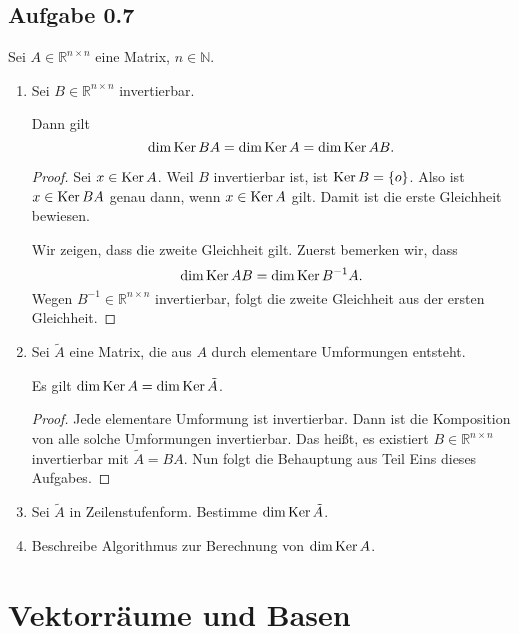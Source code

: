 \subsection*{Aufgabe 0.7}
Sei \(A \in \mathbb{R}^{n \times n}\) eine Matrix, \(n \in \mathbb{N}\).
\begin{enumerate}
\item Sei \(B \in \mathbb{R}^{n \times n}\) invertierbar.
  \begin{Behauptung}
    Dann gilt
    \[\dim \operatorname{Ker} B A = \dim \operatorname{Ker} A = \dim \operatorname{Ker} A B.\]
  \end{Behauptung}
  \begin{proof}
    Sei \(x \in \operatorname{Ker} A\).  Weil \(B\) invertierbar ist, ist \(\operatorname{Ker} B =
    \{o\}\).  Also ist \(x \in \operatorname{Ker} B A\) genau dann, wenn \(x \in \operatorname{Ker}
    A\) gilt.  Damit ist die erste Gleichheit bewiesen.

    Wir zeigen, dass die zweite Gleichheit gilt.  Zuerst bemerken wir,
    dass \[\dim \operatorname{Ker} A B = \dim \operatorname{Ker} B^{-1} A.\]  Wegen \(B^{-1} \in
    \mathbb{R}^{n \times n}\) invertierbar, folgt die zweite Gleichheit aus der
    ersten Gleichheit.
  \end{proof}

\item Sei \(\tilde{A}\) eine Matrix, die aus \(A\) durch elementare
  Umformungen entsteht.
  \begin{Behauptung}
    Es gilt \(\dim \operatorname{Ker} A = \dim \operatorname{Ker} \tilde{A}\).
  \end{Behauptung}
  \begin{proof}
    Jede elementare Umformung ist invertierbar.  Dann ist die
    Komposition von alle solche Umformungen invertierbar.  Das heißt,
    es existiert \(B \in \mathbb{R}^{n \times n}\) invertierbar mit \(\tilde{A} = B
    A\).  Nun folgt die Behauptung aus Teil Eins dieses Aufgabes.
  \end{proof}
\item Sei \(\tilde{A}\) in Zeilenstufenform.  Bestimme \(\dim \operatorname{Ker}
  \tilde{A}\).
\item Beschreibe Algorithmus zur Berechnung von \(\dim \operatorname{Ker} A\).
\end{enumerate}
\section*{Vektorräume und Basen}
